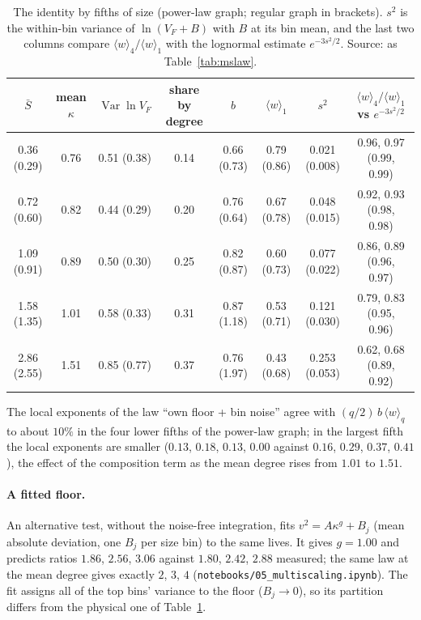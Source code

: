 \documentclass[pre,onecolumn,superscriptaddress,nofootinbib]{revtex4-2}
\newcommand{\Var}{\operatorname{Var}}
\newcommand{\Sb}{\bar S}
\begin{document}
\begin{table}[h]
\caption{The identity by fifths of size (power-law graph; regular graph in brackets).  $s^2$ is the
within-bin variance of $\ln(V_F+B)$ with $B$ at its bin mean, and the last two columns compare
$\langle w\rangle_4/\langle w\rangle_1$ with the lognormal estimate $e^{-3s^2/2}$.  Source: as Table~\ref{tab:mslaw}.}
\label{tab:fifths}
\begin{ruledtabular}
\begin{tabular}{cccccccc}
$\Sb$ & mean $\kappa$ & $\Var\ln V_F$ & share by degree & $b$ & $\langle w\rangle_1$ & $s^2$ & $\langle w\rangle_4/\langle w\rangle_1$ vs $e^{-3s^2/2}$\\
\hline
0.36 (0.29) & 0.76 & 0.51 (0.38) & 0.14 & 0.66 (0.73) & 0.79 (0.86) & 0.021 (0.008) & 0.96, 0.97 (0.99, 0.99)\\
0.72 (0.60) & 0.82 & 0.44 (0.29) & 0.20 & 0.76 (0.64) & 0.67 (0.78) & 0.048 (0.015) & 0.92, 0.93 (0.98, 0.98)\\
1.09 (0.91) & 0.89 & 0.50 (0.30) & 0.25 & 0.82 (0.87) & 0.60 (0.73) & 0.077 (0.022) & 0.86, 0.89 (0.96, 0.97)\\
1.58 (1.35) & 1.01 & 0.58 (0.33) & 0.31 & 0.87 (1.18) & 0.53 (0.71) & 0.121 (0.030) & 0.79, 0.83 (0.95, 0.96)\\
2.86 (2.55) & 1.51 & 0.85 (0.77) & 0.37 & 0.76 (1.97) & 0.43 (0.68) & 0.253 (0.053) & 0.62, 0.68 (0.89, 0.92)\\
\end{tabular}
\end{ruledtabular}
\end{table}

The local exponents of the law ``own floor + bin noise'' agree with $(q/2)\,b\,\langle w\rangle_q$ to about $10\%$
in the four lower fifths of the power-law graph; in the largest fifth the local exponents are smaller
($0.13$, $0.18$, $0.13$, $0.00$ against $0.16$, $0.29$, $0.37$, $0.41$), the effect of the composition term as
the mean degree rises from $1.01$ to $1.51$.

\paragraph{A fitted floor.}  An alternative test, without the noise-free integration, fits
$v^2=A\kappa^g+B_j$ (mean absolute deviation, one $B_j$ per size bin) to the same lives.  It gives
$g=1.00$ and predicts ratios $1.86$, $2.56$, $3.06$ against $1.80$, $2.42$, $2.88$ measured; the same law at
the mean degree gives exactly $2$, $3$, $4$ (\texttt{notebooks/05\_multiscaling.ipynb}).  The
fit assigns all of the top bins' variance to the floor ($B_j\to0$), so its partition differs from the
physical one of Table~\ref{tab:fifths}.
\end{document}
